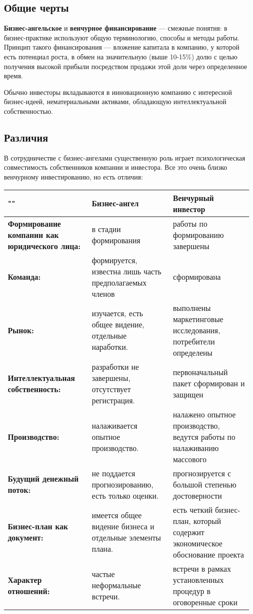 \documentclass[11pt]{article}
\theoremstyle{plain} %
\theoremstyle{definition} %
\theoremstyle{remark} %
\begin{document}
\subsection{Общие черты}

\textbf{Бизнес-ангельское} и \textbf{венчурное финансирование} — смежные понятия: в бизнес-практике используют общую терминологию, способы и методы работы. Принцип такого финансирования — вложение капитала в компанию, у которой есть потенциал роста, в обмен на значительную (выше 10-15\%) долю с целью получения высокой прибыли посредством продажи этой доли через определенное время.


Обычно инвесторы вкладываются в инновационную компанию с интересной бизнес-идеей, нематериальными активами, обладающую интеллектуальной собственностью.

\subsection{Различия}

В сотрудничестве с бизнес-ангелами существенную роль играет психологическая совместимость собственников компании и инвестора. Все это очень близко венчурному инвестированию, но есть отличия:

\vspace{1em}
\begin{tabulary}{0.94\linewidth}{|J|J|J|}
	\hline
	"" & \textbf{Бизнес-ангел} & \textbf{Венчурный инвестор} \\ \hline
	\textbf{Формирование компании как юридического лица:} & в стадии формирования & работы по формированию завершены \\ \hline
	\textbf{Команда:} & формируется, известна лишь часть предполагаемых членов & сформирована \\ \hline
	\textbf{Рынок:} & изучается, есть общее видение, отдельные наработки. & выполнены маркетинговые исследования, потребители определены \\ \hline
	\textbf{Интеллектуальная собственность:} & разработки не завершены, отсутствует регистрация. & первоначальный пакет сформирован и защищен \\ \hline
	\textbf{Производство:} & налаживается опытное производство. & налажено опытное производство, ведутся работы по налаживанию массового \\ \hline
	\textbf{Будущий денежный поток:} & не поддается прогнозированию, есть только оценки. & прогнозируется с большой степенью достоверности \\ \hline
	\textbf{Бизнес-план как документ:} & имеется общее видение бизнеса и отдельные элементы плана. & есть четкий бизнес-план, который содержит экономическое обоснование проекта \\ \hline
	\textbf{Характер отношений:} & частые неформальные встречи. & встречи в рамках установленных процедур в оговоренные сроки \\ \hline
\end{tabulary}
\end{document}
